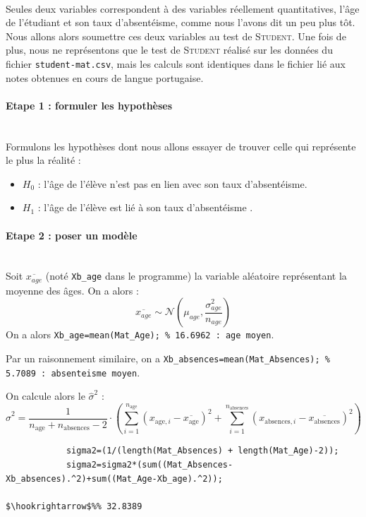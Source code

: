 \documentclass[11pt]{article}
\begin{document}
~\\ Seules deux variables correspondent à des variables réellement quantitatives, l'âge de l'étudiant et son taux d'absentéisme, comme nous l'avons dit un peu plus tôt. Nous allons alors soumettre ces deux variables au test de \textsc{Student}. Une fois de plus, nous ne représentons que le test de \textsc{Student} réalisé sur les données du fichier \texttt{student-mat.csv}, mais les calculs sont identiques dans le fichier lié aux notes obtenues en cours de langue portugaise.

\paragraph{Etape 1 : formuler les hypothèses}~\\\indent
Formulons les hypothèses dont nous allons essayer de trouver celle qui représente le plus la réalité :
\begin{itemize}
\item[\textbullet] \og $H_0$ : l'âge de l'élève n'est pas en lien avec son taux d'absentéisme\fg. 
\item[\textbullet] \og $H_1$ : l'âge de l'élève est lié à son taux d'absentéisme \fg.
\end{itemize}

\paragraph{Etape 2 : poser un modèle}~\\\indent
Soit $\overline{x_{age}}$ (noté \texttt{Xb\_age} dans le programme) la variable aléatoire représentant la moyenne des âges. On a alors : 
$$ \overline{x_{age}} \sim \mathcal{N}\left( \mu_{age},\frac{\sigma_{age}^2}{n_{age}}\right)$$ 
On a alors \lstinline{Xb_age=mean(Mat_Age); % 16.6962 : age moyen}.

Par un raisonnement similaire, on a \lstinline{Xb_absences=mean(Mat_Absences); % 5.7089 : absenteisme moyen}.

On calcule alors le $\widehat{\sigma}^2$ : 
$$ \widehat{\sigma}^2 = \frac{1}{n_{\text{age}} + n_{\text{absences}}-2}\cdot \left( \sum_{i=1}^{n_{\text{age}}} \left(x_{\text{age},i} - \overline{x_{\text{age}}} \right)^2 +  \sum_{i=1}^{n_{\text{absences}}} \left(x_{\text{absences},i} - \overline{x_{\text{absences}}} \right)^2\right)$$

\begin{lstlisting}[firstnumber=28, mathescape,caption={Calcul du $\widehat{\sigma}^2$ pour le test de \textsc{Student}}]
%Calcul du Sigma2 :
            sigma2=(1/(length(Mat_Absences) + length(Mat_Age)-2));
            sigma2=sigma2*(sum((Mat_Absences-Xb_absences).^2)+sum((Mat_Age-Xb_age).^2)); 
            											$\hookrightarrow$%% 32.8389
\end{lstlisting} 
\end{document}
